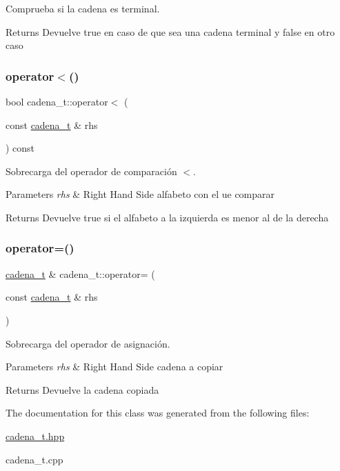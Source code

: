 Comprueba si la cadena es terminal. 

\begin{DoxyReturn}{Returns}
Devuelve true en caso de que sea una cadena terminal y false en otro caso 
\end{DoxyReturn}
\mbox{\label{classcadena__t_ace7a00008898a748dee49aa9e079793b}} 
\subsubsection{\texorpdfstring{operator$<$()}{operator<()}}
{\footnotesize\ttfamily bool cadena\+\_\+t\+::operator$<$ (\begin{DoxyParamCaption}\item[{const \hyperlink{classcadena__t}{cadena\+\_\+t} \&}]{rhs }\end{DoxyParamCaption}) const}



Sobrecarga del operador de comparación $<$. 


\begin{DoxyParams}{Parameters}
{\em rhs} & Right Hand Side alfabeto con el ue comparar \\
\hline
\end{DoxyParams}
\begin{DoxyReturn}{Returns}
Devuelve true si el alfabeto a la izquierda es menor al de la derecha 
\end{DoxyReturn}
\mbox{\label{classcadena__t_a2530672a609a4effd3d87c80e3c02baf}} 
\subsubsection{\texorpdfstring{operator=()}{operator=()}}
{\footnotesize\ttfamily \hyperlink{classcadena__t}{cadena\+\_\+t} \& cadena\+\_\+t\+::operator= (\begin{DoxyParamCaption}\item[{const \hyperlink{classcadena__t}{cadena\+\_\+t} \&}]{rhs }\end{DoxyParamCaption})}



Sobrecarga del operador de asignación. 


\begin{DoxyParams}{Parameters}
{\em rhs} & Right Hand Side cadena a copiar \\
\hline
\end{DoxyParams}
\begin{DoxyReturn}{Returns}
Devuelve la cadena copiada 
\end{DoxyReturn}


The documentation for this class was generated from the following files\+:\begin{DoxyCompactItemize}
\item 
\hyperlink{cadena__t_8hpp}{cadena\+\_\+t.\+hpp}\item 
cadena\+\_\+t.\+cpp\end{DoxyCompactItemize}
